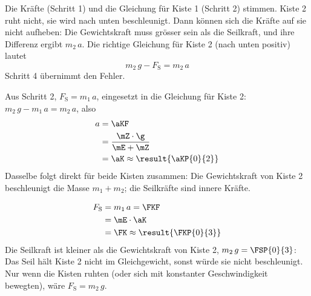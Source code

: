 \begin{abcliste}
\abc
Die Kräfte (Schritt 1) und die Gleichung für Kiste 1 (Schritt 2) stimmen.  Kiste 2 ruht nicht, sie wird nach unten beschleunigt. Dann können sich die Kräfte auf sie nicht aufheben: Die Gewichtskraft muss grösser sein als die Seilkraft, und ihre Differenz ergibt $m_2\,a$. Die richtige Gleichung für Kiste 2 (nach unten positiv) lautet
\[
 m_2\,g - F_\mathrm{S} = m_2\,a
\]
Schritt 4 übernimmt den Fehler.

\abc
Aus Schritt 2, $F_\mathrm{S} = m_1\,a$, eingesetzt in die Gleichung für Kiste 2: $m_2\,g - m_1\,a = m_2\,a$, also
\begin{align}
 a &= \aKF \\
   &= \frac{\mZ\cdot\g}{\mE+\mZ} \\
   &= \aK \approx \result{\aKP{0}{2}}
\end{align}
Dasselbe folgt direkt für beide Kisten zusammen: Die Gewichtskraft von Kiste 2 beschleunigt die Masse $m_1 + m_2$; die Seilkräfte sind innere Kräfte.

\abc
\begin{align}
 F_\mathrm{S} &= m_1\,a = \FKF \\
   &= \mE\cdot\aK \\
   &= \FK \approx \result{\FKP{0}{3}}
\end{align}
Die Seilkraft ist kleiner als die Gewichtskraft von Kiste 2, $m_2\,g = \FSP{0}{3}$: Das Seil hält Kiste 2 nicht im Gleichgewicht, sonst würde sie nicht beschleunigt. Nur wenn die Kisten ruhten (oder sich mit konstanter Geschwindigkeit bewegten), wäre $F_\mathrm{S} = m_2\,g$.
\end{abcliste}
